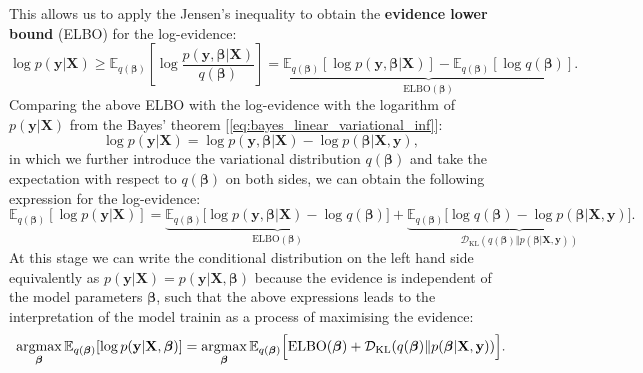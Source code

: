 This allows us to apply the Jensen's inequality to obtain  the \textbf{evidence lower bound} (ELBO) for the log-evidence:
\begin{equation}
    \label{eq:bayes_linear_variational_inf_ELBO}
\log p(\bm{y}|\bm{X}) \geq \mathbb{E}_{q(\boldsymbol{\beta})}\left[\log\frac{p(\bm{y},\boldsymbol{\beta}|\bm{X})}{q(\boldsymbol{\beta})}\right] = \underbrace{\mathbb{E}_{q(\boldsymbol{\beta})}[\log p(\bm{y},\boldsymbol{\beta}|\bm{X})] - \mathbb{E}_{q(\boldsymbol{\beta})}[\log q(\boldsymbol{\beta})]}_{\mathrm{ELBO}(\boldsymbol{\beta})}.
\end{equation}
Comparing the above ELBO with the log-evidence  with the logarithm of $p(\bm{y}|\bm{X})$ from the Bayes' theorem [\cref{eq:bayes_linear_variational_inf}]:
\begin{equation*}
    \log p(\bm{y}|\bm{X}) = \log p(\bm{y},\boldsymbol{\beta}|\bm{X}) - \log p(\boldsymbol{\beta}|\bm{X},\bm{y}),
\end{equation*}
in which we further introduce the variational distribution $q(\boldsymbol{\beta})$ and take the expectation with respect to $q(\boldsymbol{\beta})$ on both sides, we can obtain the following expression for the log-evidence:
\begin{equation}
    \label{eq:bayes_linear_variational_inf_expectation_variational_dist}
\mathbb{E}_{q(\boldsymbol{\beta})}[\log p(\bm{y}|\bm{X})] = 
\underbrace{\mathbb{E}_{q(\boldsymbol{\beta})}\Big[\log p(\bm{y},\boldsymbol{\beta}|\bm{X}) - \log q(\boldsymbol{\beta}) \Big]}_{\mathrm{ELBO}(\boldsymbol{\beta})} + \underbrace{
\mathbb{E}_{q(\boldsymbol{\beta})}\Big[\log q(\boldsymbol{\beta}) - \log p(\boldsymbol{\beta}|\bm{X},\bm{y})\Big]}_{\mathcal{D}_{\mathrm{KL}}(q(\boldsymbol{\beta})\Vert p(\boldsymbol{\beta}|\bm{X},\bm{y}))}.
\end{equation}
At this stage we can write the conditional distribution on the left hand side equivalently as $p(\bm{y}|\bm{X}) = p(\bm{y}|\bm{X},\boldsymbol{\beta})$ because the evidence is independent of the model parameters $\boldsymbol{\beta}$, such that the above expressions leads to the interpretation of the model trainin as a process of maximising the evidence:
\begin{equation}
    \label{eq:bayes_linear_variational_evidence_maximisation}
\operatorname*{argmax}_{\boldsymbol{\beta}} \mathbb{E}_{q(\boldsymbol{\beta})}[\log p(\mathbf{y}|\mathbf{X},\boldsymbol{\beta})] = \operatorname*{argmax}_{\boldsymbol{\beta}} \mathbb{E}_{q(\boldsymbol{\beta})} \Big[\mathrm{ELBO}(\boldsymbol{\beta}) + \mathcal{D}_{\mathrm{KL}}(q(\boldsymbol{\beta})\Vert p(\boldsymbol{\beta}|\mathbf{X},\mathbf{y}))\Big].
\end{equation}      
